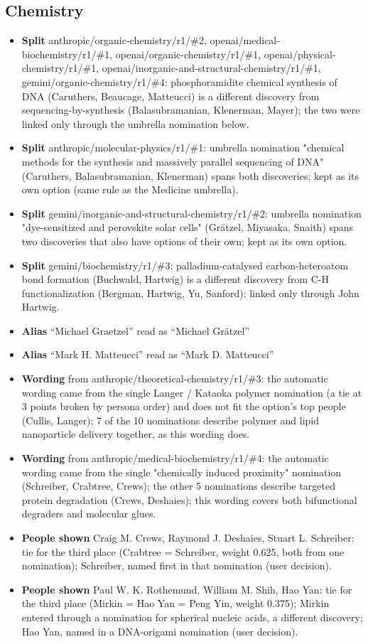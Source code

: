 \documentclass[11pt]{article}
\begin{document}
\subsection*{Chemistry}
\begin{itemize}[leftmargin=*]
\item \textbf{Split} anthropic/organic-chemistry/r1/\#2, openai/medical-biochemistry/r1/\#1, openai/organic-chemistry/r1/\#1, openai/physical-chemistry/r1/\#1, openai/inorganic-and-structural-chemistry/r1/\#1, gemini/organic-chemistry/r1/\#4: phosphoramidite chemical synthesis of DNA (Caruthers, Beaucage, Matteucci) is a different discovery from sequencing-by-synthesis (Balasubramanian, Klenerman, Mayer); the two were linked only through the umbrella nomination below.
\item \textbf{Split} anthropic/molecular-physics/r1/\#1: umbrella nomination "chemical methods for the synthesis and massively parallel sequencing of DNA" (Caruthers, Balasubramanian, Klenerman) spans both discoveries; kept as its own option (same rule as the Medicine umbrella).
\item \textbf{Split} gemini/inorganic-and-structural-chemistry/r1/\#2: umbrella nomination "dye-sensitized and perovskite solar cells" (Grätzel, Miyasaka, Snaith) spans two discoveries that also have options of their own; kept as its own option.
\item \textbf{Split} gemini/biochemistry/r1/\#3: palladium-catalysed carbon-heteroatom bond formation (Buchwald, Hartwig) is a different discovery from C-H functionalization (Bergman, Hartwig, Yu, Sanford); linked only through John Hartwig.
\item \textbf{Alias} ``Michael Graetzel'' read as ``Michael Grätzel''
\item \textbf{Alias} ``Mark H. Matteucci'' read as ``Mark D. Matteucci''
\item \textbf{Wording} from anthropic/theoretical-chemistry/r1/\#3: the automatic wording came from the single Langer / Kataoka polymer nomination (a tie at 3 points broken by persona order) and does not fit the option's top people (Cullis, Langer); 7 of the 10 nominations describe polymer and lipid nanoparticle delivery together, as this wording does.
\item \textbf{Wording} from anthropic/medical-biochemistry/r1/\#4: the automatic wording came from the single "chemically induced proximity" nomination (Schreiber, Crabtree, Crews); the other 5 nominations describe targeted protein degradation (Crews, Deshaies); this wording covers both bifunctional degraders and molecular glues.
\item \textbf{People shown} Craig M. Crews, Raymond J. Deshaies, Stuart L. Schreiber: tie for the third place (Crabtree = Schreiber, weight 0.625, both from one nomination); Schreiber, named first in that nomination (user decision).
\item \textbf{People shown} Paul W. K. Rothemund, William M. Shih, Hao Yan: tie for the third place (Mirkin = Hao Yan = Peng Yin, weight 0.375); Mirkin entered through a nomination for spherical nucleic acids, a different discovery; Hao Yan, named in a DNA-origami nomination (user decision).
\end{itemize}
\end{document}
